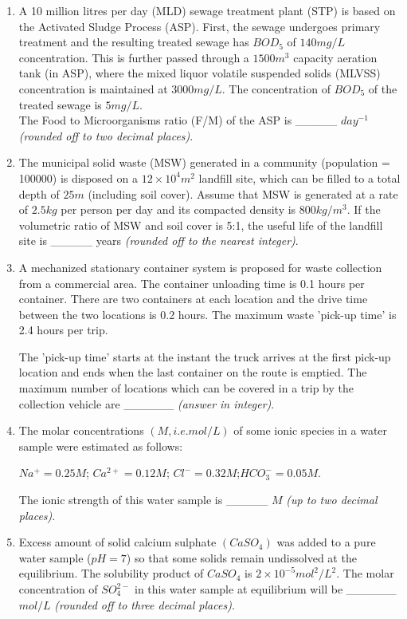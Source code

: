 \documentclass[journal]{IEEEtran}
\begin{document}
\begin{enumerate}[start=1]
\item A 10 million litres per day (MLD) sewage treatment plant (STP) is based on the Activated Sludge Process (ASP). First, the sewage undergoes primary treatment and the resulting treated sewage has $BOD_5$ of $140 mg/L$ concentration. This is further passed through a $1500 m^3$ capacity aeration tank (in ASP), where the mixed liquor volatile suspended solids (MLVSS) concentration is maintained at $3000 mg/L$. The concentration of $BOD_5$ of the treated sewage is $5 mg/L$.\\
The Food to Microorganisms ratio (F/M) of the ASP is \_\_\_\_\_ $day^{-1}$ \textit{(rounded off to two decimal places)}. \hfill{}

\item The municipal solid waste (MSW) generated in a community (population = 100000) is disposed on a $12\times10^4 m^2$ landfill site, which can be filled to a total depth of $25 m$ (including soil cover). Assume that MSW is generated at a rate of $2.5 kg$ per person per day and its compacted density is $800 kg/m^3$. If the volumetric ratio of MSW and soil cover is 5:1, the useful life of the landfill site is \_\_\_\_\_
years \textit{(rounded off to the nearest integer)}. \hfill{}

\item A mechanized stationary container system is proposed for waste collection from a commercial area. The container unloading time is 0.1 hours per container. There are two containers at each location and the drive time between the two locations is 0.2 hours. The maximum waste 'pick-up time' is 2.4 hours per trip.

The 'pick-up time' starts at the instant the truck arrives at the first pick-up location and ends when the last container on the route is emptied. The maximum number of locations which can be covered in a trip by the collection vehicle are \_\_\_\_\_\_ \textit{(answer in integer)}. \hfill{}

\item The molar concentrations $(M, i.e. mol/L)$ of some ionic species in a water sample were estimated as follows:

$Na^+ = 0.25 M$; $Ca^{2+} = 0.12 M$; $Cl^- = 0.32 M$;$HCO_3^-= 0.05 M$.

The ionic strength of this water sample is \_\_\_\_\_ $M$ \textit{(up to two decimal places)}. \hfill{}

\item Excess amount of solid calcium sulphate $(CaSO_4)$ was added to a pure water sample ($pH = 7$) so that some solids remain undissolved at the equilibrium. The solubility product of $CaSO_4$ is $2\times10^{-5} mol^2/L^2$. The molar concentration of $SO_4^{2-}$ in this water sample at equilibrium will be \_\_\_\_\_\_ $mol/L$ \textit{(rounded off to three decimal places)}. \hfill{}


\end{enumerate}
\end{document}
